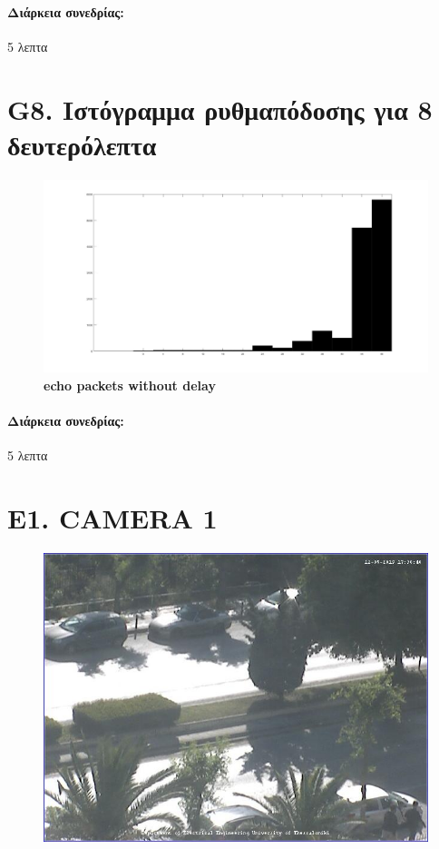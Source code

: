 \documentclass{article}
\begin{document}
\paragraph{Διάρκεια συνεδρίας:} 5 λεπτα
\newpage
\large{}

\section*{G8. Ιστόγραμμα ρυθμαπόδοσης για 8 δευτερόλεπτα}

\begin{figure}[h!]
 \begin{center}
 \advance\leftskip-6.8cm
  \includegraphics[width=250mm,scale=0.7]{g8s2.jpg}
    \caption*{\textbf{echo packets without delay}}
  
\end{center}
\end{figure}
\paragraph{Διάρκεια συνεδρίας:} 5 λεπτα
\newpage
\large{}

\section*{E1. CAMERA 1}

\begin{figure}[h!]
 \begin{center}
 \advance\leftskip-4cm
  \includegraphics[width=200mm,scale=0.7]{pic1s2.jpeg}
   
  
\end{center}
\end{figure}
\newpage
\large{}
\end{document}
